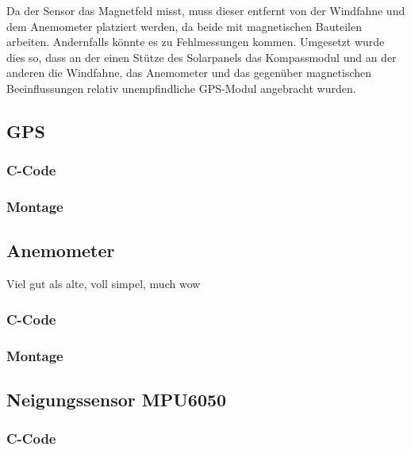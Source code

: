 Da der Sensor das Magnetfeld misst, muss dieser entfernt von der Windfahne und dem Anemometer platziert werden, da beide mit magnetischen Bauteilen arbeiten. Andernfalls könnte es zu Fehlmessungen kommen. Umgesetzt wurde dies so, dass an der einen Stütze des Solarpanels das Kompassmodul und an der anderen die Windfahne, das Anemometer und das gegenüber magnetischen Beeinflussungen relativ unempfindliche GPS-Modul angebracht wurden. %


\subsection{GPS}

\subsubsection{C-Code}

\subsubsection{Montage}

\subsection{Anemometer}

Viel gut als alte, voll simpel, much wow

\subsubsection{C-Code}

\subsubsection{Montage}

\subsection{Neigungssensor MPU6050}

\subsubsection{C-Code}


